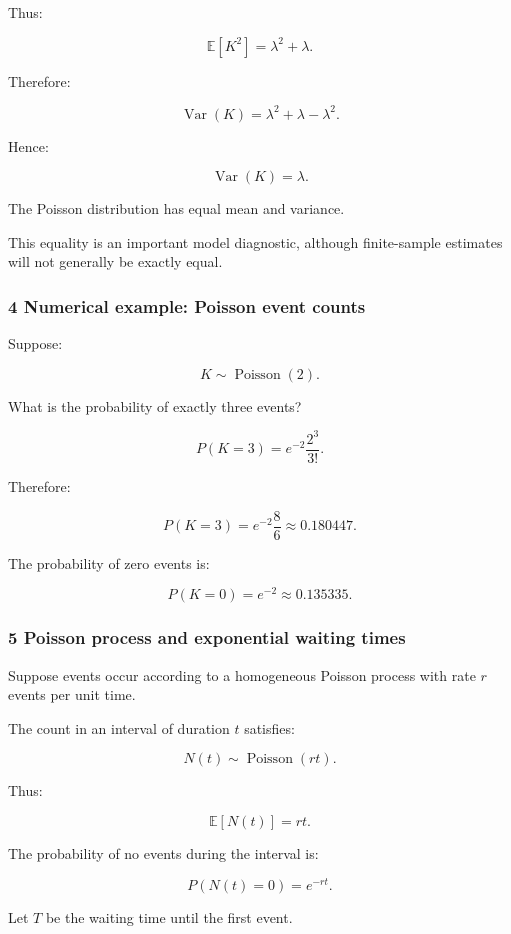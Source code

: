 Thus:

\[
 \mathbb E[K^2] = \lambda^2+\lambda.
\]

Therefore:

\[
 \operatorname{Var}(K) = \lambda^2+\lambda-\lambda^2.
\]

Hence:

\[
 \boxed{ \operatorname{Var}(K)=\lambda }.
\]

The Poisson distribution has equal mean and variance.

This equality is an important model diagnostic, although finite-sample estimates will not generally be exactly equal.

\subsubsection{4 Numerical example: Poisson event counts}\label{02-foundations-ii-ch024-numerical-example-poisson-event-counts}

Suppose:

\[
 K\sim\operatorname{Poisson}(2).
\]

What is the probability of exactly three events?

\[
 P(K=3) = e^{-2}\frac{2^3}{3!}.
\]

Therefore:

\[
 P(K=3)= e^{-2}\frac86 \approx\boxed{0.180447}.
\]

The probability of zero events is:

\[
 P(K=0)=e^{-2}\approx0.135335.
\]

\subsubsection{5 Poisson process and exponential waiting times}\label{02-foundations-ii-ch024-poisson-process-and-exponential-waiting-times}

Suppose events occur according to a homogeneous Poisson process with rate \(r\) events per unit time.

The count in an interval of duration \(t\) satisfies:

\[
 \boxed{ N(t)\sim\operatorname{Poisson}(rt) }.
\]

Thus:

\[
 \mathbb E[N(t)]=rt.
\]

The probability of no events during the interval is:

\[
 P(N(t)=0)=e^{-rt}.
\]

Let \(T\) be the waiting time until the first event.

